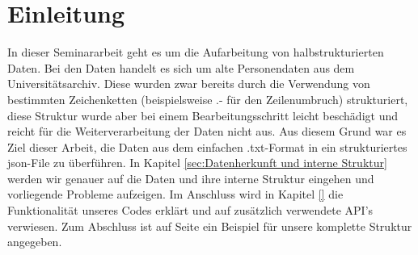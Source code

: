 \section{Einleitung}
 \label{sec:Einleitung}

In dieser Seminararbeit geht es um die Aufarbeitung von halbstrukturierten Daten. Bei den Daten handelt es sich um alte Personendaten aus dem Universitätsarchiv. Diese wurden zwar bereits durch die Verwendung von bestimmten Zeichenketten (beispielsweise .- für den Zeilenumbruch) strukturiert, diese Struktur wurde aber bei einem Bearbeitungsschritt leicht beschädigt und reicht für die Weiterverarbeitung der Daten nicht aus. Aus diesem Grund war es Ziel dieser Arbeit, die Daten aus dem einfachen .txt-Format in ein strukturiertes json-File zu überführen. In Kapitel \ref{sec:Datenherkunft und interne Struktur} werden wir genauer auf die Daten und ihre interne Struktur eingehen und vorliegende Probleme aufzeigen. Im Anschluss wird in Kapitel \ref{} die Funktionalität unseres Codes erklärt und auf zusätzlich verwendete API's verwiesen. Zum Abschluss ist auf Seite \pageref{sec:Beispielstruktur} ein Beispiel für unsere komplette Struktur angegeben.